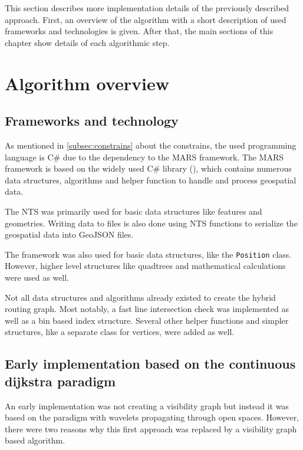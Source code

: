
This section describes more implementation details of the previously described approach.
First, an overview of the algorithm with a short description of used frameworks and technologies is given.
After that, the main sections of this chapter show details of each algorithmic step.

\section{Algorithm overview}

	\subsection{Frameworks and technology}
	
		As mentioned in \cref{subsec:constrains} about the constrains, the used programming language is C\# due to the dependency to the MARS framework.
		The MARS framework is based on the widely used C\# library  (), which contains numerous data structures, algorithms and helper function to handle and process geospatial data.
		
		The NTS was primarily used for basic data structures like features and geometries.
		Writing data to files is also done using NTS functions to serialize the geospatial data into GeoJSON files.
		
		The  framework was also used for basic data structures, like the \texttt{Position} class.
		However, higher level structures like quadtrees and mathematical calculations were used as well.
		
		Not all data structures and algorithms already existed to create the hybrid routing graph.
		Most notably, a fast line intersection check was implemented as well as a bin based index structure.
		Several other helper functions and simpler structures, like a separate class for vertices, were added as well.

	\subsection{Early implementation based on the continuous dijkstra paradigm}
	
		An early implementation was not creating a visibility graph but instead it was based on the  paradigm with wavelets propagating through open spaces.
		However, there were two reasons why this first approach was replaced by a visibility graph based algorithm.
		
